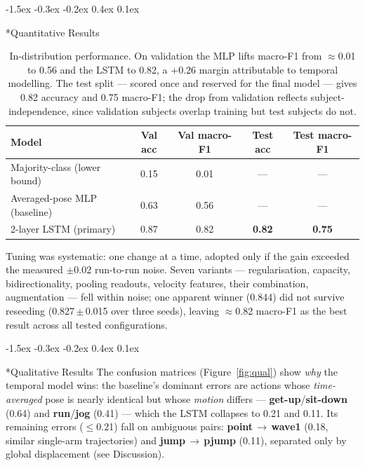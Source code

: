 \documentclass[final]{article}
\makeatletter
\renewcommand{\section}{%
  \@startsection{section}{1}{\z@}%
                {-1.5ex \@plus -0.3ex \@minus -0.2ex}%
                {0.4ex \@plus 0.1ex}%
                {\large\bf\raggedright}%
}
\makeatother
\begin{document}
\section*{Quantitative Results}
\begin{table}[!h]
\centering\small
\begin{tabular}{lcccc}
\toprule
Model & Val acc & Val macro-F1 & Test acc & Test macro-F1 \\
\midrule
Majority-class (lower bound) & 0.15 & 0.01 & --- & --- \\
Averaged-pose MLP (baseline) & 0.63 & 0.56 & --- & --- \\
2-layer LSTM (primary)       & 0.87 & 0.82 & \textbf{0.82} & \textbf{0.75} \\
\bottomrule
\end{tabular}
\caption{In-distribution performance. On validation the MLP lifts macro-F1 from $\approx$0.01 to 0.56 and the LSTM to 0.82, a $+0.26$ margin attributable to temporal modelling. The test split --- scored once and reserved for the final model --- gives 0.82 accuracy and 0.75 macro-F1; the drop from validation reflects subject-independence, since validation subjects overlap training but test subjects do not.}
\label{tab:results}
\end{table}

Tuning was systematic: one change at a time, adopted only if the gain exceeded the measured $\pm$0.02 run-to-run noise. Seven variants --- regularisation, capacity, bidirectionality, pooling readouts, velocity features, their combination, augmentation --- fell within noise; one apparent winner (0.844) did not survive reseeding (0.827\,$\pm$\,0.015 over three seeds), leaving $\approx$0.82 macro-F1 as the best result across all tested configurations.

\section*{Qualitative Results}
The confusion matrices (Figure~\ref{fig:qual}) show \emph{why} the temporal model wins: the baseline's dominant errors are actions whose \emph{time-averaged} pose is nearly identical but whose \emph{motion} differs --- \textbf{get-up}/\textbf{sit-down} (0.64) and \textbf{run}/\textbf{jog} (0.41) --- which the LSTM collapses to 0.21 and 0.11. Its remaining errors ($\le$0.21) fall on ambiguous pairs: \textbf{point}$\,\to\,$\textbf{wave1} (0.18, similar single-arm trajectories) and \textbf{jump}$\,\to\,$\textbf{pjump} (0.11), separated only by global displacement (see Discussion).
\end{document}
